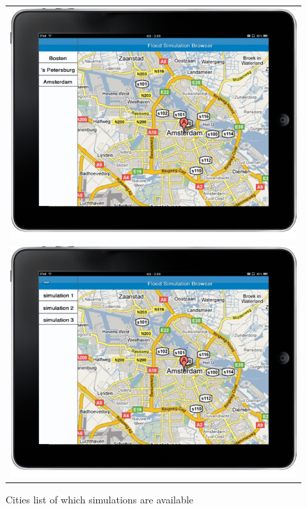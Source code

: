 \begin{figure}[ht]
\center
\begin{tabular}{c}
	\includegraphics[scale=0.3]{mockup1_1.png} \\
	\includegraphics[scale=0.3]{mockup2_1.png}
\end{tabular}
\label{fig:mockup}
\caption{Cities list of which simulations are available}
\end{figure}


